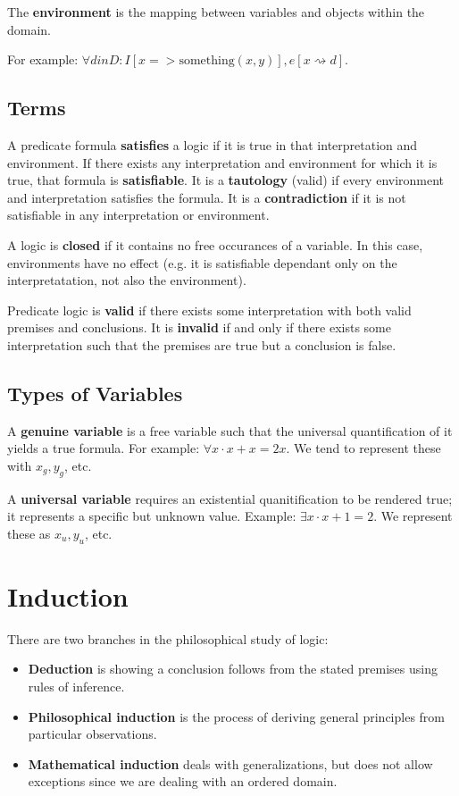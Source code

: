 \documentclass[12pt]{article}
\begin{document}
The {\bf environment} is the mapping between variables and objects within the domain.

For example: $\forall d in D : I[x => \text{something}(x,y)], e[x \rightsquigarrow d]$.

\subsection*{Terms}
A predicate formula {\bf satisfies} a logic if it is true in that interpretation and environment. If there exists any interpretation and environment for which it is true, that formula is {\bf satisfiable}. It is a {\bf tautology} (valid) if every environment and interpretation satisfies the formula. It is a {\bf contradiction} if it is not satisfiable in any interpretation or environment.

A logic is {\bf closed} if it contains no free occurances of a variable. In this case, environments have no effect (e.g. it is satisfiable dependant only on the interpretatation, not also the environment).

Predicate logic is {\bf valid} if there exists some interpretation with both valid premises and conclusions. It is {\bf invalid} if and only if there exists some interpretation such that the premises are true but a conclusion is false.

\subsection*{Types of Variables}
A {\bf genuine variable} is a free variable such that the universal quantification of it yields a true formula. For example: $\forall x \cdot x + x = 2x$. We tend to represent these with $x_g, y_g$, etc.

A {\bf universal variable} requires an existential quanitification to be rendered true; it represents a specific but unknown value. Example: $\exists x \cdot x + 1 = 2$. We represent these as $x_u, y_u$, etc.

\section*{Induction}
There are two branches in the philosophical study of logic:
\begin{itemize}
\item {\bf Deduction} is showing a conclusion follows from the stated premises using rules of inference.
\item {\bf Philosophical induction} is the process of deriving general principles from particular observations.
\item {\bf Mathematical induction} deals with generalizations, but does not allow exceptions since we are dealing with an ordered domain.
\end{itemize}
\end{document}
